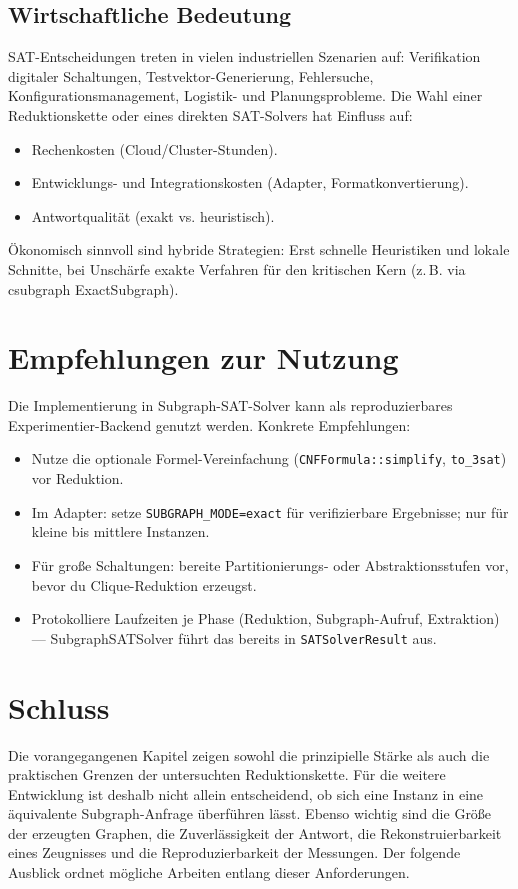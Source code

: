 \documentclass[a4paper,12pt]{article}
\theoremstyle{definition}
\begin{document}
\subsection{Wirtschaftliche Bedeutung}
SAT-Entscheidungen treten in vielen industriellen Szenarien auf: Verifikation digitaler Schaltungen, Testvektor-Generierung, Fehlersuche, Konfigurationsmanagement, Logistik- und Planungsprobleme. Die Wahl einer Reduktionskette oder eines direkten SAT-Solvers hat Einfluss auf:
\begin{itemize}
  \item Rechenkosten (Cloud/Cluster-Stunden).
  \item Entwicklungs- und Integrationskosten (Adapter, Formatkonvertierung).
  \item Antwortqualität (exakt vs. heuristisch).
\end{itemize}

Ökonomisch sinnvoll sind hybride Strategien: Erst schnelle Heuristiken und lokale Schnitte, bei Unschärfe exakte Verfahren für den kritischen Kern (z.\,B. via csubgraph ExactSubgraph).

\section{Empfehlungen zur Nutzung}
\label{ch:use}

Die Implementierung in Subgraph-SAT-Solver kann als reproduzierbares Experimentier-Backend genutzt werden. Konkrete Empfehlungen:
\begin{itemize}
  \item Nutze die optionale Formel-Vereinfachung (\texttt{CNFFormula::simplify}, \texttt{to\_3sat}) vor Reduktion.
  \item Im Adapter: setze \texttt{SUBGRAPH\_MODE=exact} für verifizierbare Ergebnisse; nur für kleine bis mittlere Instanzen.
  \item Für große Schaltungen: bereite Partitionierungs- oder Abstraktionsstufen vor, bevor du Clique-Reduktion erzeugst.
  \item Protokolliere Laufzeiten je Phase (Reduktion, Subgraph-Aufruf, Extraktion) — SubgraphSATSolver führt das bereits in \texttt{SATSolverResult} aus.
\end{itemize}

\section{Schluss}
\label{ch:outlook}

Die vorangegangenen Kapitel zeigen sowohl die prinzipielle Stärke als auch die praktischen Grenzen der untersuchten Reduktionskette. Für die weitere Entwicklung ist deshalb nicht allein entscheidend, ob sich eine Instanz in eine äquivalente Subgraph-Anfrage überführen lässt. Ebenso wichtig sind die Größe der erzeugten Graphen, die Zuverlässigkeit der Antwort, die Rekonstruierbarkeit eines Zeugnisses und die Reproduzierbarkeit der Messungen. Der folgende Ausblick ordnet mögliche Arbeiten entlang dieser Anforderungen.
\end{document}
